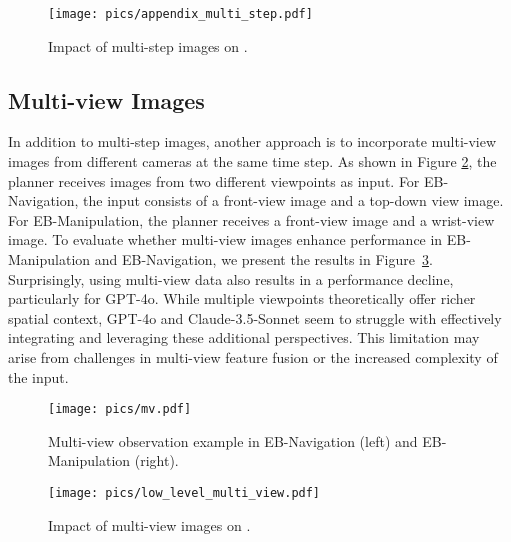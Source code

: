 \begin{figure}[t]
\begin{center}
\texttt{[image: pics/appendix\_multi\_step.pdf]}
\end{center}
\vspace{-1em}
\caption{Impact of multi-step images on \name.}
\label{fig:low_level_multi_step}
\end{figure}

\subsection{Multi-view Images}

In addition to multi-step images, another approach is to incorporate multi-view images from different cameras at the same time step. As shown in Figure \ref{fig:mv_low_level}, the planner receives images from two different viewpoints as input. For EB-Navigation, the input consists of a front-view image and a top-down view image. For EB-Manipulation, the planner receives a front-view image and a wrist-view image. To evaluate whether multi-view images enhance performance in EB-Manipulation and EB-Navigation, we present the results in Figure~\ref{fig:low_level_multi_view}. Surprisingly, using multi-view data also results in a performance decline, particularly for GPT-4o. While multiple viewpoints theoretically offer richer spatial context, GPT-4o and Claude-3.5-Sonnet seem to struggle with effectively integrating and leveraging these additional perspectives. This limitation may arise from challenges in multi-view feature fusion or the increased complexity of the input.

\begin{figure}[th]
\begin{center}
\texttt{[image: pics/mv.pdf]}
\end{center}
\vspace{-1em}
\caption{Multi-view observation example in EB-Navigation (left) and EB-Manipulation (right).}
\label{fig:mv_low_level}
\end{figure}


\begin{figure}[h!]
\begin{center}
\texttt{[image: pics/low\_level\_multi\_view.pdf]}
\end{center}
\vspace{-1.5em}
\caption{Impact of multi-view images on \name.}
\label{fig:low_level_multi_view}
\end{figure}


